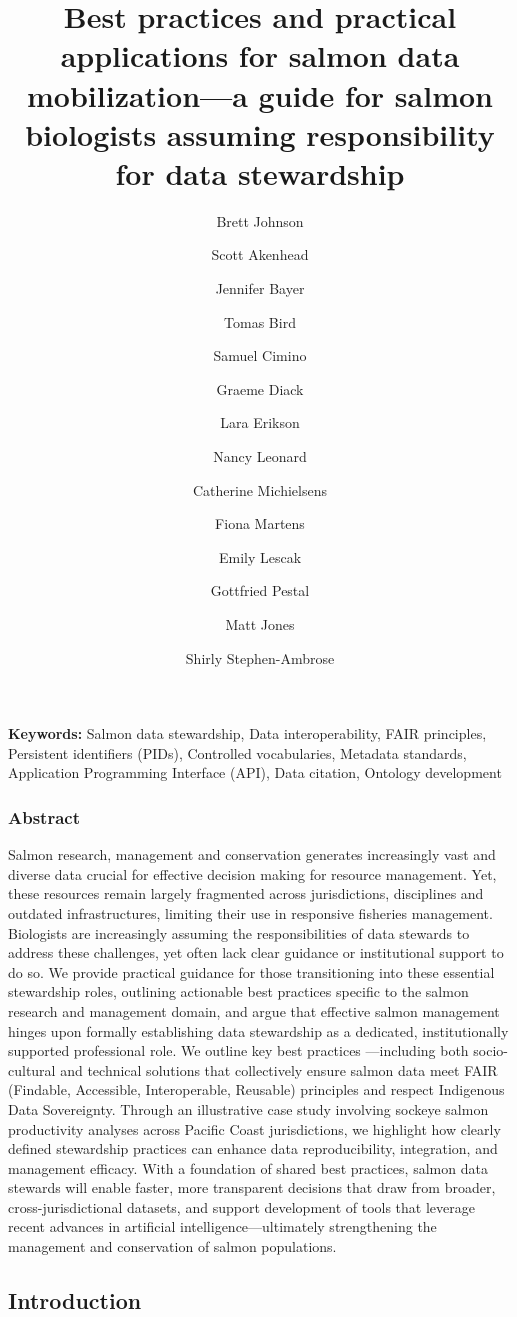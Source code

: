 \documentclass[
  letterpaper,
  DIV=11,
  numbers=noendperiod]{scrartcl}
\title{Best practices and practical applications for salmon data
mobilization---a guide for salmon biologists assuming responsibility for
data stewardship}
\author{Brett Johnson \and Scott Akenhead \and Jennifer Bayer \and Tomas
Bird \and Samuel Cimino \and Graeme Diack \and Lara Erikson \and Nancy
Leonard \and Catherine Michielsens \and Fiona Martens \and Emily
Lescak \and Gottfried Pestal \and Matt Jones \and Shirly
Stephen-Ambrose}
\date{}
\begin{document}
\maketitle


\textbf{Keywords:} Salmon data stewardship, Data interoperability, FAIR
principles, Persistent identifiers (PIDs), Controlled vocabularies,
Metadata standards, Application Programming Interface (API), Data
citation, Ontology development

\subsubsection{Abstract}\label{abstract}

Salmon research, management and conservation generates increasingly vast
and diverse data crucial for effective decision making for resource
management. Yet, these resources remain largely fragmented across
jurisdictions, disciplines and outdated infrastructures, limiting their
use in responsive fisheries management. Biologists are increasingly
assuming the responsibilities of data stewards to address these
challenges, yet often lack clear guidance or institutional support to do
so. We provide practical guidance for those transitioning into these
essential stewardship roles, outlining actionable best practices
specific to the salmon research and management domain, and argue that
effective salmon management hinges upon formally establishing data
stewardship as a dedicated, institutionally supported professional role.
We outline key best practices ---including both socio-cultural and
technical solutions that collectively ensure salmon data meet FAIR
(Findable, Accessible, Interoperable, Reusable) principles and respect
Indigenous Data Sovereignty. Through an illustrative case study
involving sockeye salmon productivity analyses across Pacific Coast
jurisdictions, we highlight how clearly defined stewardship practices
can enhance data reproducibility, integration, and management efficacy.
With a foundation of shared best practices, salmon data stewards will
enable faster, more transparent decisions that draw from broader,
cross-jurisdictional datasets, and support development of tools that
leverage recent advances in artificial intelligence---ultimately
strengthening the management and conservation of salmon populations.

\subsection{Introduction}\label{introduction}
\end{document}
